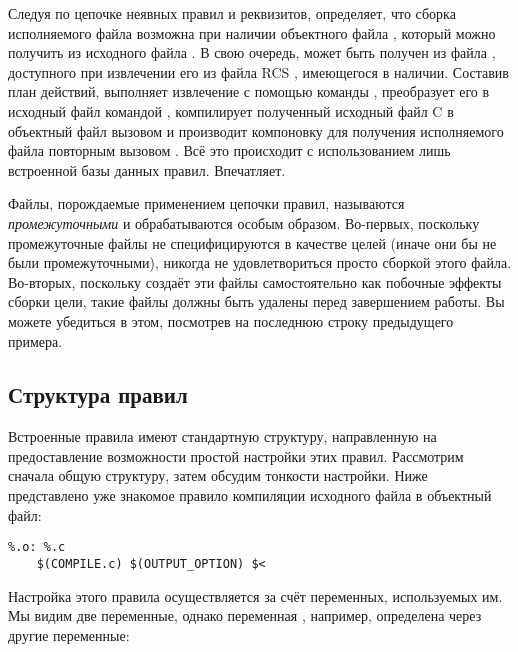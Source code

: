 Следуя по цепочке неявных правил и реквизитов, \GNUmake{} определяет,
что сборка исполняемого файла  возможна при наличии
объектного файла , который можно получить из исходного
файла . В свою очередь,  может быть
получен из файла  , доступного при
извлечении его из файла RCS , имеющегося в наличии.
Составив план действий, \GNUmake{} выполняет извлечение
 с помощью команды , преобразует его в
исходный файл  командой , компилирует
полученный исходный файл C в объектный файл  вызовом
 и производит компоновку для получения исполняемого файла
 повторным вызовом . Всё это происходит с
использованием лишь встроенной базы данных правил. Впечатляет.

Файлы, порождаемые применением цепочки правил, называются
\emph{промежуточными} и обрабатываются \GNUmake{} особым образом.
Во-первых, поскольку промежуточные файлы не специфицируются в качестве
целей (иначе они бы не были промежуточными), \GNUmake{} никогда не
удовлетвориться просто сборкой этого файла. Во-вторых, поскольку
\GNUmake{} создаёт эти файлы самостоятельно как побочные эффекты
сборки цели, такие файлы должны быть удалены перед завершением работы.
Вы можете убедиться в этом, посмотрев на последнюю строку предыдущего
примера.

\subsection{Структура правил}
Встроенные правила имеют стандартную структуру, направленную на
предоставление возможности простой настройки этих правил.
Рассмотрим сначала общую структуру, затем обсудим тонкости настройки.
Ниже представлено уже знакомое правило компиляции исходного файла
\Clang{} в объектный файл:

{\footnotesize
\begin{verbatim}
%.o: %.c
    $(COMPILE.c) $(OUTPUT_OPTION) $<
\end{verbatim}
}

Настройка этого правила осуществляется за счёт переменных, используемых
им. Мы видим две переменные, однако переменная
, например, определена через другие переменные:

